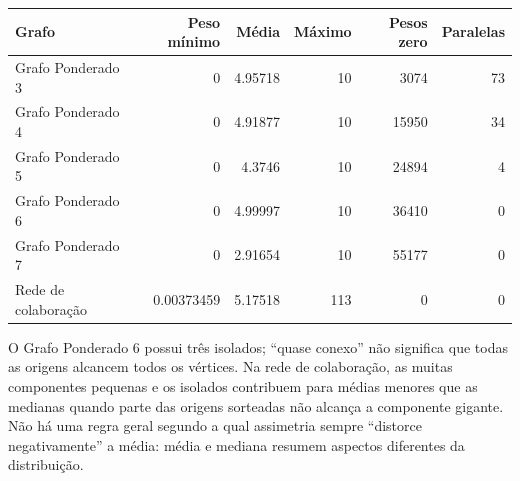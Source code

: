 \documentclass[a4paper,12pt]{article}
\begin{document}
\par\smallskip\noindent\begin{minipage}{\textwidth}\centering
\begingroup\fontsize{8.8}{11}\selectfont
\setlength{\tabcolsep}{4pt}
\begin{tabular}{lrrrrr}
\toprule
Grafo & Peso mínimo & Média & Máximo & Pesos zero & Paralelas \\
\midrule
Grafo Ponderado 3 & \num{0} & \num{4.95718} & \num{10} & \num{3074} & \num{73} \\
Grafo Ponderado 4 & \num{0} & \num{4.91877} & \num{10} & \num{15950} & \num{34} \\
Grafo Ponderado 5 & \num{0} & \num{4.3746} & \num{10} & \num{24894} & \num{4} \\
Grafo Ponderado 6 & \num{0} & \num{4.99997} & \num{10} & \num{36410} & \num{0} \\
Grafo Ponderado 7 & \num{0} & \num{2.91654} & \num{10} & \num{55177} & \num{0} \\
Rede de colaboração & \num{0.00373459} & \num{5.17518} & \num{113} & \num{0} & \num{0} \\
\bottomrule
\end{tabular}
\endgroup
{}
\end{minipage}\par\smallskip

O Grafo Ponderado 6 possui três isolados; ``quase conexo'' não significa que todas as origens alcancem todos os vértices. Na rede de colaboração, as muitas componentes pequenas e os isolados contribuem para médias menores que as medianas quando parte das origens sorteadas não alcança a componente gigante. Não há uma regra geral segundo a qual assimetria sempre ``distorce negativamente'' a média: média e mediana resumem aspectos diferentes da distribuição.
\clearpage
\end{document}
